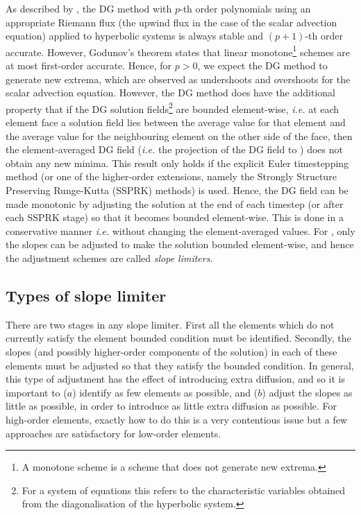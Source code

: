 As described by \cite{cockburn2001}, the DG method with $p$-th order
polynomials using an appropriate Riemann flux (the upwind flux in the
case of the scalar advection equation) applied to hyperbolic systems
is always stable and $(p+1)$-th order accurate. However, Godunov's
theorem states that linear monotone\footnote{A monotone scheme is a
  scheme that does not generate new extrema.} schemes are at most
first-order accurate. Hence, for $p>0$, we expect the DG method to
generate new extrema, which are observed as undershoots and overshoots
for the scalar advection equation. However, the DG method does have
the additional property that if the DG solution fields\footnote{For a
  system of equations this refers to the characteristic variables
  obtained from the diagonalisation of the hyperbolic system.} are
bounded element-wise, \emph{i.e.} at each element face a solution
field lies between the average value for that element and the average
value for the neighbouring element on the other side of the face, then
the element-averaged DG field (\emph{i.e.} the projection of the DG
field to \Pzero) does not obtain any new minima. This result only holds if
the explicit Euler timestepping method (or one of the higher-order
extensions, namely the Strongly Structure Preserving Runge-Kutta
(SSPRK) methods) is used. Hence, the DG field can be made monotonic by
adjusting the solution at the end of each timestep (or after each
SSPRK stage) so that it becomes bounded element-wise. This is done in
a conservative manner \emph{i.e.} without changing the element-averaged
values. For \Pone, only the slopes can be adjusted to make the solution
bounded element-wise, and hence the adjustment schemes are called
\emph{slope limiters}.

\subsection{Types of slope limiter}
\label{Sect:ND_DG_slope_limiters}
There are two stages in any slope limiter. First all the elements
which do not currently satisfy the element bounded condition must be
identified. Secondly, the slopes (and possibly higher-order components
of the solution) in each of these elements must be adjusted so that
they satisfy the bounded condition. In general, this type of
adjustment has the effect of introducing extra diffusion, and so it is important to ($a$)
identify as few elements as possible, and ($b$) adjust the slopes as
little as possible, in order to introduce as little extra diffusion as
possible. For high-order elements, exactly how to do this is a very
contentious issue but a few approaches are satisfactory for low-order
elements.
